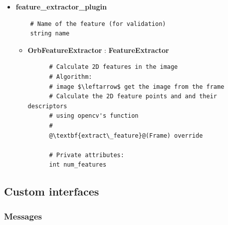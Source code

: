 \begin{itemize}
  \item \textbf{feature\_extractor\_plugin}
  
  \begin{verbatim}
    # Name of the feature (for validation)
    string name
  \end{verbatim}

  \begin{itemize}
    \item {\textbf{OrbFeatureExtractor} : \textbf{FeatureExtractor}}
    \begin{lstlisting}
      # Calculate 2D features in the image
      # Algorithm:
      # image $\leftarrow$ get the image from the frame
      # Calculate the 2D feature points and and their descriptors 
      # using opencv's function
      # 
      @\textbf{extract\_feature}@(Frame) override

      # Private attributes:
      int num_features
    \end{lstlisting}
    
  \end{itemize}
\end{itemize}

\subsection{Custom interfaces}

\subsubsection{Messages}

